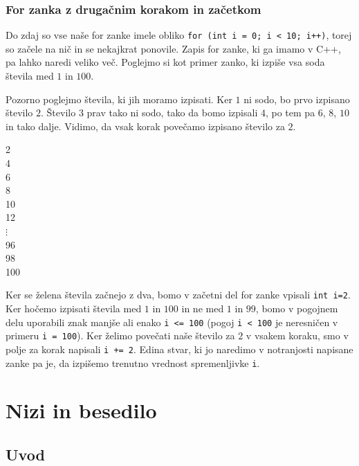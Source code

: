 \documentclass{book}
\begin{document}
\newpage
\subsection{For zanka z drugačnim korakom in začetkom}

Do zdaj so vse naše for zanke imele obliko
\verb-for (int i = 0; i < 10; i++)-, torej so začele na nič in se nekajkrat
ponovile. Zapis for zanke, ki ga imamo v C++, pa lahko naredi veliko več.
Poglejmo si kot primer zanko, ki izpiše vsa soda števila med $1$ in $100$.

Pozorno poglejmo števila, ki jih moramo izpisati. Ker $1$ ni sodo, bo prvo
izpisano število $2$. Število $3$ prav tako ni sodo, tako da bomo izpisali $4$,
po tem pa $6$, $8$, $10$ in tako dalje. Vidimo, da vsak korak povečamo izpisano
število za $2$.

\begin{examples}


\begin{inout}
	2  \\
	4  \\
	6  \\
	8  \\
	10 \\
	12 \\
	$\vdots$ \\
	96 \\
	98 \\
	100
\end{inout}

\end{examples}

Ker se želena števila začnejo z dva, bomo v začetni del for zanke vpisali
\texttt{int i=2}. Ker hočemo izpisati števila med $1$ in $100$ in ne med $1$ in
$99$, bomo v pogojnem delu uporabili znak manjše ali enako \verb+i <= 100+
(pogoj \verb+i < 100+ je neresničen v primeru \verb+i = 100+).
Ker želimo povečati naše število za $2$ v vsakem koraku, smo v polje za korak
napisali \verb-i += 2-.
Edina stvar, ki jo naredimo v notranjosti napisane zanke pa je, da izpišemo
trenutno vrednost spremenljivke \verb+i+.

\chapter{Nizi in besedilo}

\section{Uvod}
\end{document}
